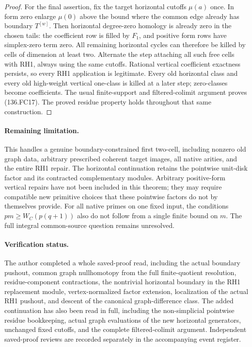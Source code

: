\begin{proof}
For the final assertion, fix the target horizontal cutoffs
\(\mu(a)\) once. In form zero enlarge \(\mu(0)\) above
the bound where the common edge already has boundary \(T^{[w]}\).
Then horizontal degree-zero homology is already zero in the chosen
tails: the coefficient row is filled by \(F_1\), and positive
form rows have simplex-zero term zero. All remaining horizontal
cycles can therefore be killed by cells of dimension at least two.
Alternate the step attaching all such free cells with RH1, always
using the same cutoffs. Rational vertical coefficient exactness
persists, so every RH1 application is legitimate. Every old
horizontal class and every old high-weight vertical one-class
is killed at a later step; zero-classes become coefficients.
The usual finite-support and filtered-colimit argument proves
(136.FC17). The proved residue property holds throughout that
same construction.
\end{proof}

\paragraph{Remaining limitation.}
This handles a genuine boundary-constrained first two-cell,
including nonzero old graph data, arbitrary prescribed coherent
target images, all native arities, and the entire RH1 repair.
The horizontal continuation retains the pointwise unit-disk factor
and its contracted complementary modules. Arbitrary positive-form
vertical repairs have not been included in this theorem; they may
require compatible new primitive choices that these pointwise
factors do not by themselves provide. For all
native primes on one fixed input, the conditions
\(pm\geq W_C(p(q+1))\) also do not follow from a single
finite bound on \(m\). The full integral common-source question
remains unresolved.

\paragraph{Verification status.}
The author completed a whole saved-proof read, including the
actual boundary pushout, common graph nullhomotopy from the full
finite-quotient resolution, residue-component contractions,
the nontrivial horizontal boundary in the RH1 replacement module,
vertex-normalized factor extension, localization of the actual
RH1 pushout, and descent of the canonical graph-difference class.
The added continuation has also been read in full, including the
non-simplicial pointwise residue bookkeeping, actual graph evaluations
of the new horizontal generators, unchanged fixed cutoffs, and
the complete filtered-colimit argument.
Independent saved-proof reviews are recorded separately in the
accompanying event register.
